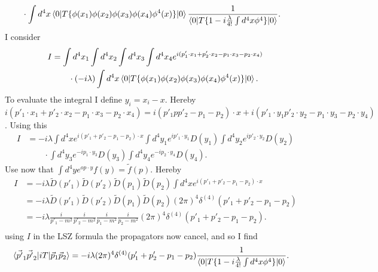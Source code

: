 \begin{example}
\begin{enumerate}
\begin{equation}
\begin{split}
				&\cdot\int d^4x\braket{0|T\{\phi(x_1)\phi(x_2)\phi(x_3)\phi(x_4)\phi^4(x)\}|0}\frac{1}{\braket{0|T\{1-i\frac{\lambda}{4!}\int d^4x \phi^4\}|0}}.
			\end{split}
		\end{equation} 
		I consider
		\begin{equation}
			\begin{split}
				I&=\int d^4x_1\int d^4x_2\int d^4x_3\int d^4x_4e^{i(p'_1\cdot x_1+p'_2\cdot x_2-p_1\cdot x_3-p_2\cdot x_4)}\\
				&\qquad\cdot(-i\lambda)\int d^4x\braket{0|T\{\phi(x_1)\phi(x_2)\phi(x_3)\phi(x_4)\phi^4(x)\}|0}.
			\end{split}
		\end{equation}  
		To evaluate the integral I define $y_i=x_i-x$. Hereby $i(p'_1\cdot x_1+p'_2\cdot x_2-p_1\cdot x_3-p_2\cdot x_4)=i(p'_1pp'_2-p_1-p_2)\cdot x+i(p'_1\cdot y_1p'_2\cdot y_2-p_1\cdot y_3-p_2\cdot y_4)$. Using this
		\begin{equation}
			\begin{split}
				I&=-i\lambda\int d^4xe^{i(p'_1+p'_2-p_1-p_2)\cdot x}\int d^4y_1e^{ip'_1\cdot y_1}D(y_1)\int d^4y_2e^{ip'_2\cdot y_2}D(y_2)\\
				&\qquad\cdot \int d^4y_3e^{-ip_1\cdot y_3}D(y_3)\int d^4y_4e^{-ip_2\cdot y_4}D(y_4).
			\end{split}
		\end{equation}  
		Use now that $\int d^4y e^{op\cdot y}f(y)=\tilde{f}(p)$. Hereby
		\begin{equation}
			\begin{split}
				I&=-i\lambda \tilde{D}(p'_1)\tilde{D}(p'_2)\tilde{D}(p_1)\tilde{D}(p_2)\int d^4xe^{i(p'_1+p'_2-p_1-p_2)\cdot x}\\
				&=-i\lambda \tilde{D}(p'_1)\tilde{D}(p'_2)\tilde{D}(p_1)\tilde{D}(p_2)(2\pi)^4\delta^{(4)}(p'_1+p'_2-p_1-p_2)\\
				&=-i\lambda \frac{i}{p'_1-m^2}\frac{i}{p'_2-m^2}\frac{i}{p_1-m^2}\frac{i}{p_2-m^2}(2\pi)^4\delta^{(4)}(p'_1+p'_2-p_1-p_2).\\
			\end{split}
		\end{equation} 
		using $I$ in the LSZ formula the propagators now cancel, and so I find
		\begin{equation}
			\begin{split}
				\braket{\vec{p'}_1\vec{p'}_2|iT|\vec{p}_1\vec{p}_2}&=-i\lambda (2\pi)^4\delta^{(4)}(p'_1+p'_2-p_1-p_2)\frac{1}{\braket{0|T\{1-i\frac{\lambda}{4!}\int d^4x \phi^4\}|0}}.
			\end{split}

\end{equation}
\end{enumerate}
\end{example}

